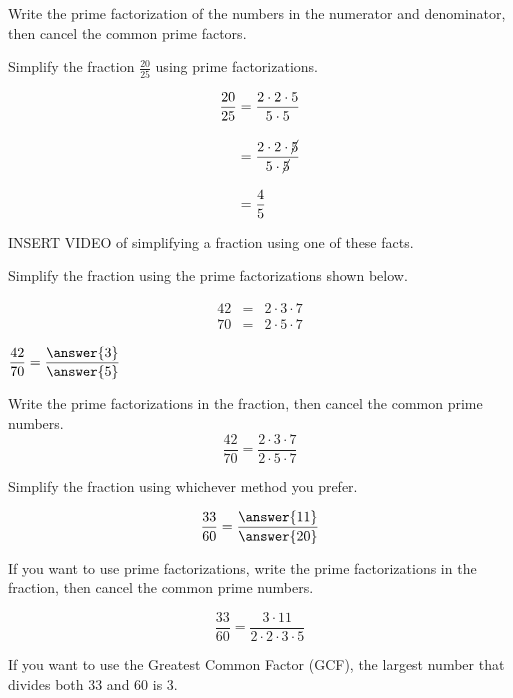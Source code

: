 \documentclass{ximera}[font=12pt]  %
\begin{document}
\begin{procedure}

Write the prime factorization of the numbers in the numerator and denominator, then cancel the common prime factors.

\end{procedure}

\begin{example}

Simplify the fraction $\textstyle \frac{20}{25}$ using prime factorizations.

\begin{align*}
\frac{20}{25} &= \frac{2 \cdot 2 \cdot 5}{5 \cdot 5} \\[1em]
              &= \frac{2 \cdot 2 \cdot \cancel{5}}{5 \cdot \cancel{5}} \\[1em]
              &= \frac{4}{5}
\end{align*}

\end{example}


INSERT VIDEO of simplifying a fraction using one of these facts.

\begin{problem}
Simplify the fraction using the prime factorizations shown below.

\begin{eqnarray*}
    42 &=& 2 \cdot 3 \cdot 7 \\
    70 &=& 2 \cdot 5 \cdot 7
\end{eqnarray*}

$\displaystyle \frac{42}{70} = \frac{\answer{3}}{\answer{5}} $

  \begin{hint}
    Write the prime factorizations in the fraction, then cancel the common prime numbers.
    \[ \frac{42}{70} = \frac{2 \cdot 3 \cdot 7}{2 \cdot 5 \cdot 7} \]
  \end{hint}

\end{problem}


\begin{problem}
Simplify the fraction using whichever method you prefer.

\[ \frac{33}{60} = \frac{\answer{11}}{\answer{20}}\]

\begin{hint}
   If you want to use prime factorizations, write the prime factorizations in the fraction, then cancel the common prime numbers.

    \[ \frac{33}{60} = \frac{3 \cdot 11}{2 \cdot 2 \cdot 3 \cdot 5} \]

  \end{hint}

  \begin{hint}
    If you want to use the Greatest Common Factor (GCF), the largest number that divides both 33 and 60 is 3.
  \end{hint}

\end{problem}
\end{document}
